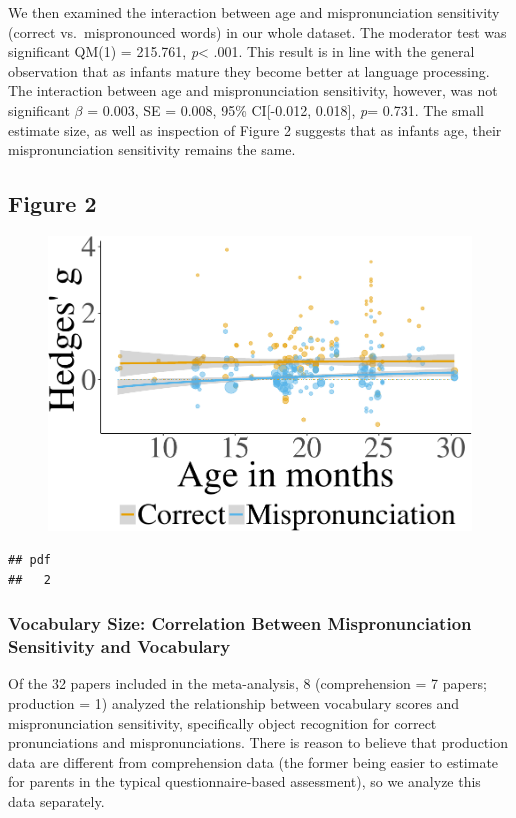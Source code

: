 \documentclass[man]{apa6}
\theoremstyle{definition}
\theoremstyle{definition}
\theoremstyle{definition}
\theoremstyle{remark}
\begin{document}
We then examined the interaction between age and mispronunciation
sensitivity (correct vs.~mispronounced words) in our whole dataset. The
moderator test was significant QM(1) = 215.761, \emph{p}\textless{}
.001. This result is in line with the general observation that as
infants mature they become better at language processing. The
interaction between age and mispronunciation sensitivity, however, was
not significant \(\beta\) = 0.003, SE = 0.008, 95\% CI{[}-0.012,
0.018{]}, \emph{p}= 0.731. The small estimate size, as well as
inspection of Figure 2 suggests that as infants age, their
mispronunciation sensitivity remains the same.

\subsection{Figure 2}\label{figure-2}

\begin{figure}[htbp]
\centering
\includegraphics{Paper_Analyses_files/figure-latex/PlotMPEffect-1.pdf}
\caption{}
\end{figure}

\begin{verbatim}
## pdf 
##   2
\end{verbatim}

\subsubsection{Vocabulary Size: Correlation Between Mispronunciation
Sensitivity and
Vocabulary}\label{vocabulary-size-correlation-between-mispronunciation-sensitivity-and-vocabulary}

Of the 32 papers included in the meta-analysis, 8 (comprehension = 7
papers; production = 1) analyzed the relationship between vocabulary
scores and mispronunciation sensitivity, specifically object recognition
for correct pronunciations and mispronunciations. There is reason to
believe that production data are different from comprehension data (the
former being easier to estimate for parents in the typical
questionnaire-based assessment), so we analyze this data separately.
\end{document}
